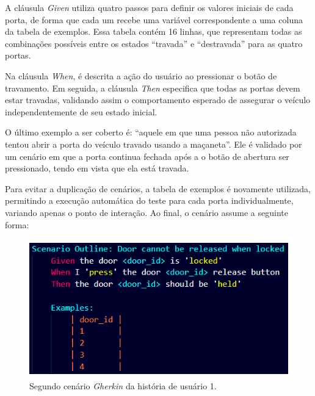 A cláusula \textit{Given} utiliza quatro passos para definir os valores iniciais de cada porta, de forma que cada um recebe uma variável correspondente a uma coluna da 
tabela de exemplos. Essa tabela contém 16 linhas, que representam todas as combinações possíveis entre os estados ``travada'' e ``destravada'' para as quatro portas.

Na cláusula \textit{When}, é descrita a ação do usuário ao pressionar o botão de travamento. Em seguida, a cláusula \textit{Then} especifica que todas as portas devem estar travadas, 
validando assim o comportamento esperado de assegurar o veículo independentemente de seu estado inicial.

O último exemplo a ser coberto é: ``aquele em que uma pessoa não autorizada tentou abrir a porta do veículo travado usando a maçaneta''. Ele é validado por um 
cenário em que a porta continua fechada após a o botão de abertura ser pressionado, tendo em vista que ela está travada.

Para evitar a duplicação de cenários, a tabela de exemplos é novamente utilizada, permitindo a execução automática do teste para cada porta individualmente, variando 
apenas o ponto de interação. Ao final, o cenário assume a seguinte forma:





\begin{figure}[H]
\centering
\includegraphics[height=6cm]{figuras/cenarios/h1c2.png}
\caption{Segundo cenário \textit{Gherkin} da história de usuário 1.}
\label{fig:h1c2}
\end{figure}

